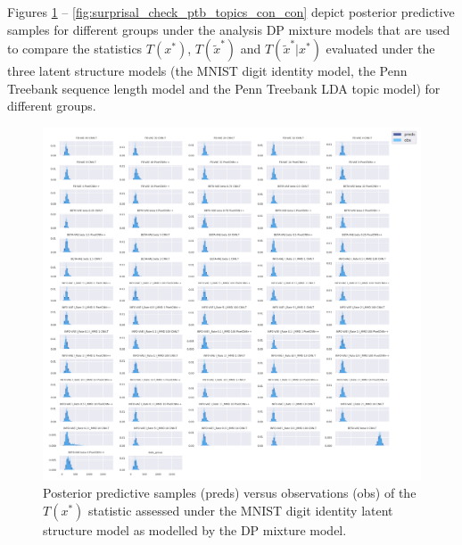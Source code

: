 Figures \ref{fig:surprisal_check_mnist_uncon_uncon} -- \ref{fig:surprisal_check_ptb_topics_con_con} depict posterior predictive samples for different groups under the analysis DP mixture models that are used to compare the statistics  $T(x^*)$,  $T(\tilde x^*)$ and $T(\tilde x^*|x^*)$ evaluated under the three latent structure models (the MNIST digit identity model, the Penn Treebank sequence length model and the Penn Treebank LDA topic model) for different groups. 

\begin{figure}[!htb]
    \centering
    \includegraphics[width=\textwidth]{images/bda_checks/surprisal_dps/mnist_prediction_checks__unconditional_unconditional.png}
    \caption{Posterior predictive samples (preds) versus observations (obs) of the $T(x^*)$ statistic assessed under the MNIST digit identity latent structure model as modelled by the DP mixture model.}
    \label{fig:surprisal_check_mnist_uncon_uncon}
\end{figure}

